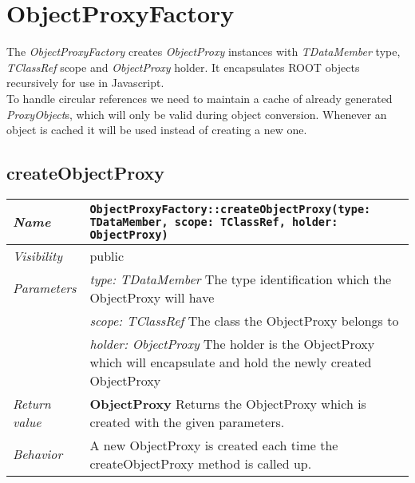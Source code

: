 \chapter{ObjectProxyFactory}
The \textit{ObjectProxyFactory} creates \textit{ObjectProxy} instances with \textit{TDataMember} type, \textit{TClassRef} scope and \textit{ObjectProxy} holder. It encapsulates ROOT objects recursively for use in Javascript.\\

To handle circular references we need to maintain a cache of already generated \textit{ProxyObject}s, which will only be valid during object conversion. Whenever an object is cached it will be used instead of creating a new one.
\section{createObjectProxy}
\begin{longtable}{p{3cm} @{\hskip 1cm} p{12cm}}
 \hline
\textit{Name} & \texttt{ObjectProxyFactory::createObjectProxy(type: TDataMember, scope: TClassRef, holder: ObjectProxy)}\\
\hline
 \textit{Visibility} & public\\
\hline
\textit{Parameters} & \textit{type: TDataMember} The type identification which the ObjectProxy will have \\
& \textit{scope: TClassRef} The class the ObjectProxy belongs to \\
& \textit{holder: ObjectProxy}  The holder is the ObjectProxy which will encapsulate and hold the newly created ObjectProxy \\
\hline
\textit{Return value} & \textbf{ObjectProxy} Returns the ObjectProxy which is created with the given parameters.\\
  \hline
 \textit{Behavior} & A new ObjectProxy is created each time the createObjectProxy method is called up. \\
\hline
\end{longtable} \pagebreak
